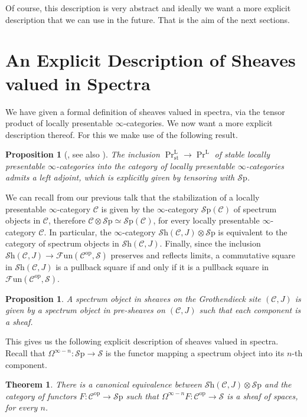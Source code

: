 \documentclass[a4paper]{book}
\newcommand{\lC}{\mathcal{C}}
\newcommand{\lF}{\mathcal{F}}
\newcommand{\mL}{\mathrm{L}}
\newcommand{\lS}{\mathcal{S}}
\newcommand{\op}{\mathrm{op}}
\newcommand{\Fun}{\lF\mathrm{un}} %
\newcommand{\Shv}{\lS\mathrm{h}} %
\newcommand{\Sp}{\lS\mathrm{p}} %
\newcommand{\st}{\mathrm{st}}
\newtheorem{theorem}[equation]{Theorem}
\newtheorem{proposition}[equation]{Proposition}
\theoremstyle{definition}
\theoremstyle{remark}
\numberwithin{equation}{section}
\begin{document}
Of course, this description is very abstract and ideally we want a more explicit description that we can use in the future. That is the aim of the next sections.

\section{An Explicit Description of Sheaves valued in Spectra}

We have given a formal definition of sheaves valued in spectra, via the tensor product of locally presentable $\infty$-categories. We now want a more explicit description thereof. For this we make use of the following result.

\begin{proposition}[{\cite{lurie2017ha}, see also \cite{gepnergrothnikolaus2015infiniteloopspacemachine}}]
 The inclusion $\Pr^\mL_{\st} \to \Pr^\mL$ of stable locally presentable $\infty$-categories into the category of locally presentable $\infty$-categories admits a left adjoint, which is explicitly given by tensoring with $\Sp$.
\end{proposition}

We can recall from our previous talk that the stabilization of a locally presentable $\infty$-category $\lC$ is given by the $\infty$-category $\Sp(\lC)$ of spectrum objects in $\lC$, therefore $\lC\otimes\Sp  \simeq \Sp(\lC)$, for every locally presentable $\infty$-category $\lC$. In particular, the $\infty$-category $ \Shv(\lC,J)\otimes \Sp$ is equivalent to the category of spectrum objects in $\Shv(\lC,J)$. Finally, since the inclusion $\Shv(\lC,J) \to \Fun(\lC^{\op},\lS)$ preserves and reflects limits, a commutative square in $\Shv(\lC,J)$ is a pullback square if and only if it is a pullback square in $\Fun(\lC^{\op},\lS)$.

\begin{proposition}
  A spectrum object in sheaves on the Grothendieck site $(\lC,J)$ is given by a spectrum object in pre-sheaves on $(\lC,J)$ such that each component is a sheaf.
\end{proposition}

This gives us the following explicit description of sheaves valued in spectra. Recall that $\Omega^{\infty-n}\colon\Sp\to\lS$ is the functor mapping a spectrum object into its $n$-th component.
\begin{theorem}
  There is a canonical equivalence between $\Shv(\lC,J)\otimes\Sp$ and the category of functors $F\colon \lC^{\op} \to \Sp$ such that $\Omega^{\infty - n} F\colon \lC^{\op} \to \lS$ is a sheaf of spaces, for every $n$.
\end{theorem}
\end{document}
